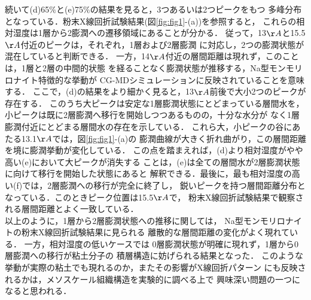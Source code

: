続いて(d)65$\%$と(e)75$\%$の結果を見ると，3つあるいは2つピークをもつ
多峰分布となっている．粉末X線回折試験結果(図\ref{fig:fig1}-(a))を参照すると，
これらの相対湿度は1層から2膨潤への遷移領域にあることが分かる．
従って，13$\AA$と15.5$\AA$付近のピークは，それぞれ，1層および2層膨潤
に対応し，2つの膨潤状態が混在していると判断できる．
一方，14$\AA$付近の層間距離は現れず，このことは，1層と2層の中間的状態
を経ることなく膨潤状態が推移する，Na型モンモリロナイト特徴的な挙動が
CG-MDシミュレーションに反映されていることを意味する．
%
ここで，(d)の結果をより細かく見ると，13$\AA$前後で大小2つのピークが存在する．
このうち大ピークは安定な1層膨潤状態にとどまっている層間水を，
小ピークは既に2層膨潤へ移行を開始しつつあるものの，十分な水分が
なく1層膨潤付近にとどまる層間水の存在を示している．
これら大，小ピークの谷にあたる13.1$\AA$では，図\ref{fig:fig1}-(a)の
膨潤曲線が大きく折れ曲がり，この層間距離を境に膨潤挙動が変化している．
この点を踏まえれば，(d)より相対湿度がやや高い(e)において大ピークが消失する
ことは，(e)は全ての層間水が2層膨潤状態に向けて移行を開始した状態にあると
解釈できる．最後に，最も相対湿度の高い(f)では，2層膨潤への移行が完全に終了し，
鋭いピークを持つ層間距離分布となっている．このときピーク位置は15.5$\AA$で，
粉末X線回折試験結果で観察される層間距離とよく一致している．\\
\hspace{\parindent}
以上のように，1層から2層膨潤状態への推移に関しては，
Na型モンモリロナイトの粉末X線回折試験結果に見られる
離散的な層間距離の変化がよく現れている．
一方，相対湿度の低いケースでは
0層膨潤状態が明確に現れず，1層から0層膨潤への移行が粘土分子の
積層構造に妨げられる結果となった．
このような挙動が実際の粘土でも現れるのか，またその影響がX線回折パターン
にも反映されるかは，メソスケール組織構造を実験的に調べる上で
興味深い問題の一つになると思われる．
